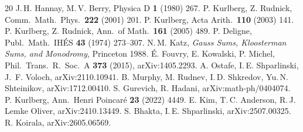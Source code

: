 \documentclass[11pt]{article}
\numberwithin{equation}{section}
\begin{document}
\begin{thebibliography}{20}
 J.\,H. Hannay, M.\,V. Berry, Physica D \textbf{1} (1980) 267.
 P. Kurlberg, Z. Rudnick, Comm.\ Math.\ Phys.\ \textbf{222} (2001) 201.
 P. Kurlberg, Acta Arith.\ \textbf{110} (2003) 141.
 P. Kurlberg, Z. Rudnick, Ann.\ of Math.\ \textbf{161} (2005) 489.
 P. Deligne, Publ.\ Math.\ IH\'ES \textbf{43} (1974) 273--307.
 N.\,M. Katz, \emph{Gauss Sums, Kloosterman Sums, and Monodromy}, Princeton 1988.
 \'E. Fouvry, E. Kowalski, P. Michel, Phil.\ Trans.\ R.\ Soc.\ A \textbf{373} (2015), arXiv:1405.2293.
 A. Ostafe, I.\,E. Shparlinski, J.~F. Voloch, arXiv:2110.10941.
 B. Murphy, M. Rudnev, I.\,D. Shkredov, Yu.\,N. Shteinikov, arXiv:1712.00410.
 S. Gurevich, R. Hadani, arXiv:math-ph/0404074.
 P. Kurlberg, Ann.\ Henri Poincar\'e \textbf{23} (2022) 4449.
 E. Kim, T.\,C. Anderson, R.\,J. Lemke Oliver, arXiv:2410.13449.
 S. Bhakta, I.\,E. Shparlinski, arXiv:2507.00325.
 R. Koirala, arXiv:2605.06569.
\end{thebibliography}
\end{document}
